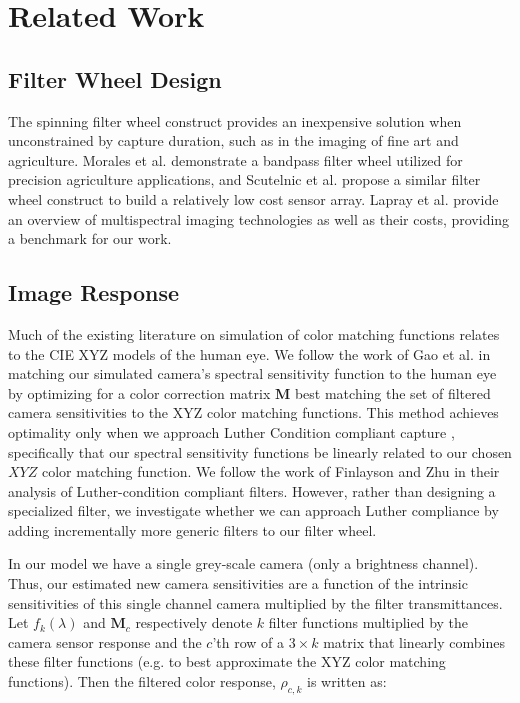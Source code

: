 \section{Related Work}
\subsection{Filter Wheel Design}

The spinning filter wheel construct provides an inexpensive solution when unconstrained by capture duration, such as in the imaging of  fine art and agriculture. 
Morales et al. \cite{morales2020multispectral} demonstrate a bandpass filter wheel utilized for precision agriculture applications, and Scutelnic et al. \cite{SCUTELNIC2024e00596} propose a similar filter wheel construct to build a relatively low cost sensor array. 
Lapray et al. \cite{lapray2014multispectral} provide an overview of multispectral imaging technologies as well as their costs, providing a benchmark for our work. 

\subsection{Image Response}
Much of the existing literature on simulation of color matching functions relates to the CIE XYZ models of the human eye. 
We follow the work of Gao et al. \cite{gao2024color} in matching our simulated camera's spectral sensitivity function to the human eye by optimizing for a color correction matrix $\boldsymbol{M}$ best matching the set of filtered camera sensitivities to the XYZ color matching functions. 
This method achieves optimality only when we approach Luther Condition compliant capture \cite{ives1915transformation}, specifically that our spectral sensitivity functions be linearly related to our chosen $XYZ$ color matching function. 
We follow the work of Finlayson and Zhu \cite{finlayson2020designing} in their analysis of Luther-condition compliant filters. 
However, rather than designing a specialized filter, we investigate whether we can approach Luther compliance by adding incrementally more generic filters to our filter wheel. 

In our model we have a single grey-scale camera (only a brightness channel). Thus, our estimated new camera sensitivities are a function of the intrinsic sensitivities of this single channel camera multiplied by the filter transmittances.
Let ${f}_k(\lambda)$ and $\boldsymbol{M}_c$ respectively denote $k$ filter functions multiplied by the camera sensor response and the $c$'th row of a $3 \times k$ matrix that linearly combines these filter functions (e.g. to best approximate the XYZ color matching functions). 
Then the filtered color response, ${\rho}_{c,k}$ is written as:

